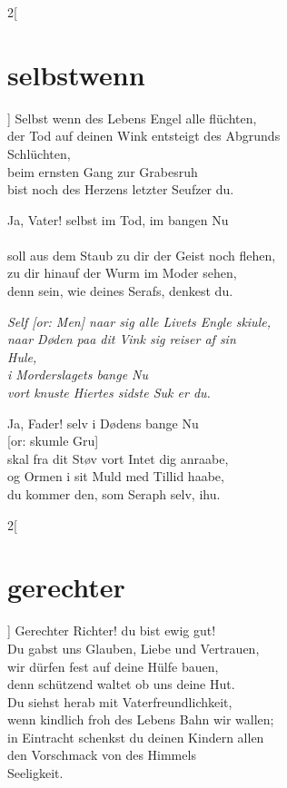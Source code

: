 \documentclass[shorttitlesize=45,tocstyle=ref]{ees}
\begin{document}
{\begin{multicols}{2}[\section{selbstwenn}]
Selbst wenn des Lebens Engel alle flüchten,\\
der Tod auf deinen Wink entsteigt des Abgrunds\\
\hspace*{1em}Schlüchten,\\
beim ernsten Gang zur Grabesruh\\
bist noch des Herzens letzter Seufzer du.

Ja, Vater! selbst im Tod, im bangen Nu\\
\hspace*{0pt}\\
soll aus dem Staub zu dir der Geist noch flehen,\\
zu dir hinauf der Wurm im Moder sehen,\\
denn sein, wie deines Serafs, denkest du.

\columnbreak\itshape
Self [or: Men] naar sig alle Livets Engle skiule,\\
naar Døden paa dit Vink sig reiser af sin\\
\hspace*{1em}Hule,\\
i Morderslagets bange Nu\\
vort knuste Hiertes sidste Suk er du.

Ja, Fader! selv i Dødens bange Nu\\
\hspace*{1em}[or: skumle Gru]\\
skal fra dit Støv vort Intet dig anraabe,\\
og Ormen i sit Muld med Tillid haabe,\\
du kommer den, som Seraph selv, ihu.
\end{multicols}

\begin{multicols}{2}[\section{gerechter}]
Gerechter Richter! du bist ewig gut!\\
Du gabst uns Glauben, Liebe und Vertrauen,\\
wir dürfen fest auf deine Hülfe bauen,\\
denn schützend waltet ob uns deine Hut.\\
Du siehst herab mit Vaterfreundlichkeit,\\
wenn kindlich froh des Lebens Bahn wir wallen;\\
in Eintracht schenkst du deinen Kindern allen\\
den Vorschmack von des Himmels\\
\hspace*{1em}Seeligkeit.


\end{multicols}}
\end{document}
